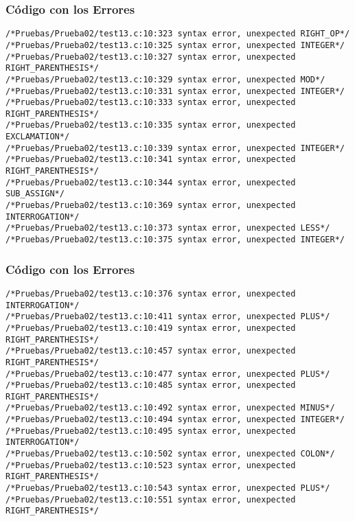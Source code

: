 \documentclass{beamer}
\begin{document}
\begin{frame}[fragile]
\frametitle{C\'odigo con los Errores}
\begin{verbatim}
/*Pruebas/Prueba02/test13.c:10:323 syntax error, unexpected RIGHT_OP*/
/*Pruebas/Prueba02/test13.c:10:325 syntax error, unexpected INTEGER*/
/*Pruebas/Prueba02/test13.c:10:327 syntax error, unexpected RIGHT_PARENTHESIS*/
/*Pruebas/Prueba02/test13.c:10:329 syntax error, unexpected MOD*/
/*Pruebas/Prueba02/test13.c:10:331 syntax error, unexpected INTEGER*/
/*Pruebas/Prueba02/test13.c:10:333 syntax error, unexpected RIGHT_PARENTHESIS*/
/*Pruebas/Prueba02/test13.c:10:335 syntax error, unexpected EXCLAMATION*/
/*Pruebas/Prueba02/test13.c:10:339 syntax error, unexpected INTEGER*/
/*Pruebas/Prueba02/test13.c:10:341 syntax error, unexpected RIGHT_PARENTHESIS*/
/*Pruebas/Prueba02/test13.c:10:344 syntax error, unexpected SUB_ASSIGN*/
/*Pruebas/Prueba02/test13.c:10:369 syntax error, unexpected INTERROGATION*/
/*Pruebas/Prueba02/test13.c:10:373 syntax error, unexpected LESS*/
/*Pruebas/Prueba02/test13.c:10:375 syntax error, unexpected INTEGER*/
\end{verbatim}
\end{frame}
\begin{frame}[fragile]
\frametitle{C\'odigo con los Errores}
\begin{verbatim}
/*Pruebas/Prueba02/test13.c:10:376 syntax error, unexpected INTERROGATION*/
/*Pruebas/Prueba02/test13.c:10:411 syntax error, unexpected PLUS*/
/*Pruebas/Prueba02/test13.c:10:419 syntax error, unexpected RIGHT_PARENTHESIS*/
/*Pruebas/Prueba02/test13.c:10:457 syntax error, unexpected RIGHT_PARENTHESIS*/
/*Pruebas/Prueba02/test13.c:10:477 syntax error, unexpected PLUS*/
/*Pruebas/Prueba02/test13.c:10:485 syntax error, unexpected RIGHT_PARENTHESIS*/
/*Pruebas/Prueba02/test13.c:10:492 syntax error, unexpected MINUS*/
/*Pruebas/Prueba02/test13.c:10:494 syntax error, unexpected INTEGER*/
/*Pruebas/Prueba02/test13.c:10:495 syntax error, unexpected INTERROGATION*/
/*Pruebas/Prueba02/test13.c:10:502 syntax error, unexpected COLON*/
/*Pruebas/Prueba02/test13.c:10:523 syntax error, unexpected RIGHT_PARENTHESIS*/
/*Pruebas/Prueba02/test13.c:10:543 syntax error, unexpected PLUS*/
/*Pruebas/Prueba02/test13.c:10:551 syntax error, unexpected RIGHT_PARENTHESIS*/
\end{verbatim}
\end{frame}
\end{document}
